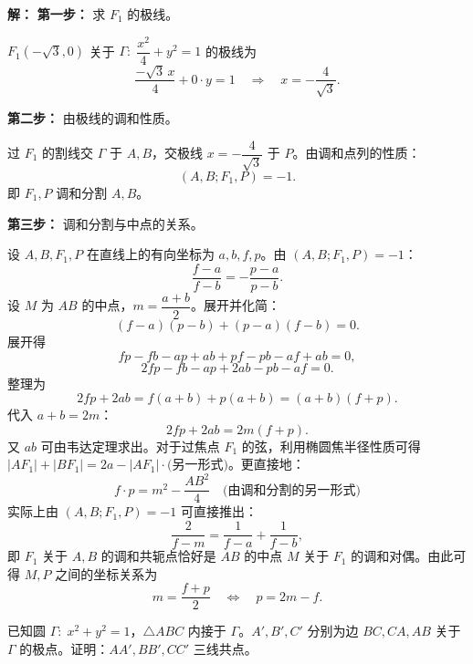 \documentclass[12pt,a4paper]{ctexart}
\theoremstyle{definition}
\begin{document}
\begin{solutionbox}
\textbf{解：}
\textbf{第一步：} 求 $F_1$ 的极线。

$F_1(-\sqrt{3},0)$ 关于 $\Gamma:\;\dfrac{x^2}{4}+y^2=1$ 的极线为
\[
  \frac{-\sqrt{3}\,x}{4}+0\cdot y=1 \quad\Longrightarrow\quad x=-\frac{4}{\sqrt{3}}.
\]

\textbf{第二步：} 由极线的调和性质。

过 $F_1$ 的割线交 $\Gamma$ 于 $A,B$，交极线 $x=-\dfrac{4}{\sqrt{3}}$ 于 $P$。由调和点列的性质：
\[
  (A,B;F_1,P)=-1.
\]
即 $F_1,P$ 调和分割 $A,B$。

\textbf{第三步：} 调和分割与中点的关系。

设 $A,B,F_1,P$ 在直线上的有向坐标为 $a,b,f,p$。由 $(A,B;F_1,P)=-1$：
\[
  \frac{f-a}{f-b}=-\frac{p-a}{p-b}.
\]
设 $M$ 为 $AB$ 的中点，$m=\dfrac{a+b}{2}$。展开并化简：
\[
  (f-a)(p-b)+(p-a)(f-b)=0.
\]
展开得
\[
  fp-fb-ap+ab+pf-pb-af+ab=0,
\]
\[
  2fp-fb-ap+2ab-pb-af=0.
\]
整理为
\[
  2fp+2ab=f(a+b)+p(a+b)=(a+b)(f+p).
\]
代入 $a+b=2m$：
\[
  2fp+2ab=2m(f+p).
\]
又 $ab$ 可由韦达定理求出。对于过焦点 $F_1$ 的弦，利用椭圆焦半径性质可得 $|AF_1|+|BF_1|=2a-|AF_1|\cdot\text{(另一形式)}$。更直接地：
\[
  f\cdot p=m^2-\frac{AB^2}{4} \quad\text{(由调和分割的另一形式)}
\]
实际上由 $(A,B;F_1,P)=-1$ 可直接推出：
\[
  \boxed{\frac{2}{f-m}=\frac{1}{f-a}+\frac{1}{f-b},}
\]
即 $F_1$ 关于 $A,B$ 的调和共轭点恰好是 $AB$ 的中点 $M$ 关于 $F_1$ 的调和对偶。由此可得 $M,P$ 之间的坐标关系为
\[
  m = \frac{f+p}{2} \quad\Longleftrightarrow\quad p = 2m - f.
\]
\end{solutionbox}

\vspace{6pt}

\begin{examplebox}
已知圆 $\Gamma:\;x^2+y^2=1$，$\triangle ABC$ 内接于 $\Gamma$。$A',B',C'$ 分别为边 $BC,CA,AB$ 关于 $\Gamma$ 的极点。证明：$AA',BB',CC'$ 三线共点。
\end{examplebox}
\end{document}
